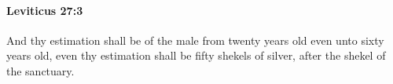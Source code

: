 
		\paragraph{Leviticus 27:3} %
			\label{LEVITICUS-27-3}

			And thy estimation shall be of the male from twenty years old even unto sixty years old, even thy estimation shall be fifty shekels of silver, after the shekel of the sanctuary.


